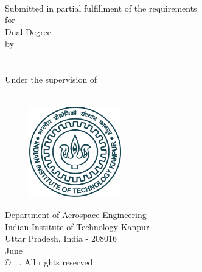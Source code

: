 \thispagestyle{empty}
\vspace*{0.50cm}
\begin{center}
 {\LARGE  {\textbf{\thesistitle}}\\}

\vspace*{1.50cm}
{ Submitted in partial fulfillment of the requirements
\\
for
}\\

\vspace*{1.0cm}
{\Large { Dual Degree}}\\

\vspace*{1.0cm}
{by}\\

\vspace*{1.0cm}
{\Large{\textbf{\authorname}}}\\
\vspace{0.3cm}
{\textbf{\authorrollno}}\\

\vspace*{1cm}
{ Under the supervision of }\\

\vspace*{0.3cm}
{\large{ \supervisorname}}\\

\vspace*{0.50cm}

\begin{figure}[h]
\centering
  \includegraphics[width=4cm,height=4cm]{HeadTail/IIT_Kanpur_Logo.png}
\end{figure}

\vspace*{0.50cm}
{ Department of Aerospace Engineering\\
Indian Institute of Technology Kanpur \\
Uttar Pradesh, India - 208016 \\
June ~\the\year}\\
\vspace{1.8cm}
\copyright~\the\year ~\authorname.  All rights reserved.
\end{center}

\clearpage

\thispagestyle{plain}
\clearpage
